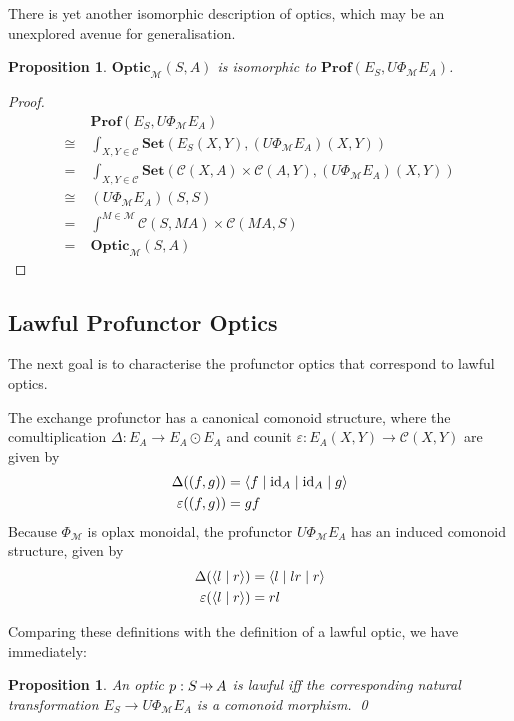 \documentclass[11pt,a4paper]{article}
\theoremstyle{plain}
\newtheorem{proposition}[theorem]{Proposition}
\theoremstyle{definition}
\newcommand{\C}{\mathscr{C}}
\newcommand{\M}{\mathscr{M}}
\newcommand{\Pastro}{\Phi}
\newcommand{\Set}{\mathbf{Set}}
\newcommand{\Prof}{\mathbf{Prof}}
\newcommand{\Optic}{\mathbf{Optic}}
\newcommand{\id}{\mathrm{id}}
\newcommand{\rep}[2]{{\ensuremath \left\langle #1 \mid #2 \right\rangle}}
\newcommand{\repthree}[3]{{\ensuremath \langle #1 \mid #2 \mid #3 \rangle}}
\newcommand{\repfour}[4]{{\ensuremath \langle #1 \mid #2 \mid #3 \mid #4 \rangle}}
\newcommand{\hto}{\ensuremath{\,\mathaccent\shortmid\rightarrow\,}}
\begin{document}
There is yet another isomorphic description of optics, which may be an unexplored avenue for generalisation.

\begin{proposition}
  $\Optic_\M(S, A)$ is isomorphic to $\Prof(E_S, U \Phi_\M E_A)$.
\end{proposition}
\begin{proof}
  \begin{align*}
    &\Prof(E_S, U \Phi_\M E_A) \\
    \cong\;&\int_{X,Y \in \C} \Set(E_S(X,Y), (U \Phi_\M E_A)(X,Y)) \\
    = \;&\int_{X,Y \in \C} \Set(\C(X,A) \times \C(A,Y), (U \Phi_\M E_A)(X,Y)) \\
    \cong \;& (U \Phi_\M E_A)(S,S) \\
    = \;&\int^{M \in \M} \C(S, MA) \times \C(MA, S) \\
    = \;&\Optic_\M(S, A)
  \end{align*}
\end{proof}

\subsection{Lawful Profunctor Optics}

The next goal is to characterise the profunctor optics that correspond to lawful optics.

The exchange profunctor has a canonical comonoid structure, where the comultiplication $\Delta : E_A \to E_A \odot E_A$ and counit $\varepsilon : E_A(X, Y) \to \C(X, Y)$ are given by
\begin{align*}
  \Delta((f, g)) &= \repfour{f}{\id_A}{\id_A}{g}  \\
  \varepsilon((f, g)) &= gf
\end{align*}
Because $\Pastro_\M$ is oplax monoidal, the profunctor $U\Pastro_\M E_A$ has an induced comonoid structure, given by
\begin{align*}
  \Delta(\rep{l}{r }) &= \repthree{l}{lr}{r } \\
  \varepsilon(\rep{l}{r }) &= rl
\end{align*}

Comparing these definitions with the definition of a lawful optic, we have immediately:

\begin{proposition}
  An optic $p : S \hto A$ is lawful iff the corresponding natural transformation $E_S \rightarrow U \Phi_\M E_A$ is a comonoid morphism. \qed
\end{proposition}
\end{document}
